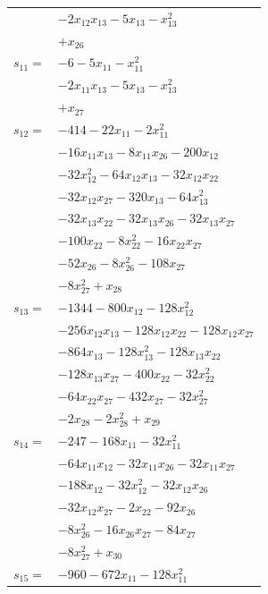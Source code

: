 \begin{longtable}{@{}r@{\;}l@{}}
 & \(\displaystyle -2x_{12}x_{13} -5x_{13} -x_{13}^{2}\) \\
 & \(\displaystyle +x_{26}\) \\[3pt]
\(s_{11}=\) & \(\displaystyle -6 -5x_{11} -x_{11}^{2}\) \\
 & \(\displaystyle -2x_{11}x_{13} -5x_{13} -x_{13}^{2}\) \\
 & \(\displaystyle +x_{27}\) \\[3pt]
\(s_{12}=\) & \(\displaystyle -414 -22x_{11} -2x_{11}^{2}\) \\
 & \(\displaystyle -16x_{11}x_{13} -8x_{11}x_{26} -200x_{12}\) \\
 & \(\displaystyle -32x_{12}^{2} -64x_{12}x_{13} -32x_{12}x_{22}\) \\
 & \(\displaystyle -32x_{12}x_{27} -320x_{13} -64x_{13}^{2}\) \\
 & \(\displaystyle -32x_{13}x_{22} -32x_{13}x_{26} -32x_{13}x_{27}\) \\
 & \(\displaystyle -100x_{22} -8x_{22}^{2} -16x_{22}x_{27}\) \\
 & \(\displaystyle -52x_{26} -8x_{26}^{2} -108x_{27}\) \\
 & \(\displaystyle -8x_{27}^{2} +x_{28}\) \\[3pt]
\(s_{13}=\) & \(\displaystyle -1344 -800x_{12} -128x_{12}^{2}\) \\
 & \(\displaystyle -256x_{12}x_{13} -128x_{12}x_{22} -128x_{12}x_{27}\) \\
 & \(\displaystyle -864x_{13} -128x_{13}^{2} -128x_{13}x_{22}\) \\
 & \(\displaystyle -128x_{13}x_{27} -400x_{22} -32x_{22}^{2}\) \\
 & \(\displaystyle -64x_{22}x_{27} -432x_{27} -32x_{27}^{2}\) \\
 & \(\displaystyle -2x_{28} -2x_{28}^{2} +x_{29}\) \\[3pt]
\(s_{14}=\) & \(\displaystyle -247 -168x_{11} -32x_{11}^{2}\) \\
 & \(\displaystyle -64x_{11}x_{12} -32x_{11}x_{26} -32x_{11}x_{27}\) \\
 & \(\displaystyle -188x_{12} -32x_{12}^{2} -32x_{12}x_{26}\) \\
 & \(\displaystyle -32x_{12}x_{27} -2x_{22} -92x_{26}\) \\
 & \(\displaystyle -8x_{26}^{2} -16x_{26}x_{27} -84x_{27}\) \\
 & \(\displaystyle -8x_{27}^{2} +x_{30}\) \\[3pt]
\(s_{15}=\) & \(\displaystyle -960 -672x_{11} -128x_{11}^{2}\) \\

\end{longtable}
